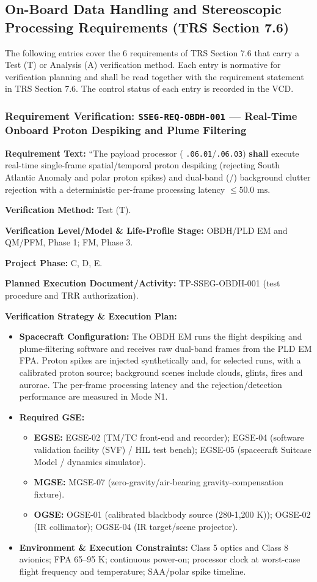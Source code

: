 \subsection{On-Board Data Handling and Stereoscopic Processing Requirements (TRS Section 7.6)}
The following entries cover the 6 requirements of TRS Section 7.6 that carry a Test (T) or Analysis (A) verification method. Each entry is normative for verification planning and shall be read together with the requirement statement in TRS Section 7.6. The control status of each entry is recorded in the VCD.
\subsubsection{Requirement Verification: \texttt{SSEG-REQ-OBDH-001} --- Real-Time Onboard Proton Despiking and Plume Filtering}
\label{ver:SSEG-REQ-OBDH-001}
\textbf{Requirement Text:} ``The  payload processor ( \texttt{.06.01}/\texttt{.06.03}) \textbf{shall} execute real-time single-frame spatial/temporal proton despiking (rejecting South Atlantic Anomaly and polar proton spikes) and dual-band (/) background clutter rejection with a deterministic per-frame processing latency $\le 50.0\text{ ms}$.
\par\textbf{Verification Method:} Test (T).
\par\textbf{Verification Level/Model \& Life-Profile Stage:} OBDH/PLD EM and QM/PFM, Phase 1; FM, Phase 3.
\par\textbf{Project Phase:} C, D, E.
\par\textbf{Planned Execution Document/Activity:} TP-SSEG-OBDH-001 (test procedure and TRR authorization).
\par\textbf{Verification Strategy \& Execution Plan:}
\begin{itemize}
\item \textbf{Spacecraft Configuration:} The OBDH EM runs the flight despiking and plume-filtering software and receives raw dual-band frames from the PLD EM FPA. Proton spikes are injected synthetically and, for selected runs, with a calibrated proton source; background scenes include clouds, glints, fires and aurorae. The per-frame processing latency and the rejection/detection performance are measured in Mode N1.
\item \textbf{Required GSE:}
\begin{itemize}
\item \textbf{EGSE:} EGSE-02 (TM/TC front-end and recorder); EGSE-04 (software validation facility (SVF) / HIL test bench); EGSE-05 (spacecraft Suitcase Model / dynamics simulator).
\item \textbf{MGSE:} MGSE-07 (zero-gravity/air-bearing gravity-compensation fixture).
\item \textbf{OGSE:} OGSE-01 (calibrated blackbody source (280-1,200 K)); OGSE-02 (IR collimator); OGSE-04 (IR target/scene projector).
\end{itemize}
\item \textbf{Environment \& Execution Constraints:} Class 5 optics and Class 8 avionics; FPA 65--95 K; continuous power-on; processor clock at worst-case flight frequency and temperature; SAA/polar spike timeline.
\end{itemize}
